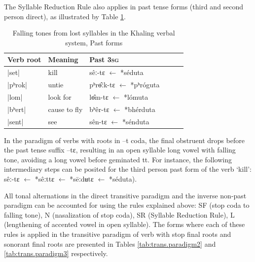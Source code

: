 \documentclass[oldfontcommands,oneside,a4paper,11pt]{article}
\newcommand{\ipa}[1]{{\phon \mbox{#1}}} %
\begin{document}
The Syllable Reduction Rule also applies in past tense forms (third and second person direct), as illustrated by Table \ref{tab:falling.verb3}. 

 
\begin{table}[h] 
\caption{Falling tones from lost syllables in the Khaling verbal system, Past forms} \centering  \label{tab:falling.verb3} 
\begin{tabular}{llllll} 
\toprule 
Verb root	&Meaning	& Past \textsc{3sg} \\ 
\midrule 
|\ipa{set}|	&	kill			&\ipa{sêː-tɛ} $\leftarrow$ \ipa{*séduta}  \\ 
|\ipa{pʰrok}|	&	untie		&\ipa{pʰrɵ̂ːk-tɛ} $\leftarrow$ \ipa{*pʰróguta} \\
|\ipa{lom}|	&	look for		&\ipa{lɵ̂m-tɛ} $\leftarrow$ \ipa{*lómuta}  \\ 
\midrule
|\ipa{bʰert}|	&	cause to fly			&\ipa{bʰêr-tɛ} $\leftarrow$ \ipa{*bhérduta} \\ 
|\ipa{sent}|	&	see			&\ipa{sên-tɛ} $\leftarrow$ \ipa{*sénduta}  \\ 
\bottomrule 
\end{tabular} 
\end{table} 

In the paradigm of verbs with roots in \ipa{--t} coda, the final obstruent drops before the past tense suffix \ipa{--tɛ}, resulting in an open syllable long vowel with falling tone, avoiding a long vowel before geminated \ipa{tt}. For instance, the following intermediary steps can be posited for the third person past form of the verb `kill': \ipa{sêː-tɛ}   $\leftarrow$ \ipa{*sêːttɛ}  $\leftarrow$ \ipa{*sēːdʉtɛ}  $\leftarrow$ \ipa{*séduta}).



All tonal alternations in the direct transitive paradigm and the inverse non-past paradigm can be accounted for using the rules explained above: SF (stop coda to falling tone), N (nasalization of stop coda), SR (Syllable Reduction Rule), L (lengthening of accented vowel in open syllable). The forms where each of these rules is applied in the transitive paradigm of verb with stop final roots and sonorant final roots are presented   in Tables \ref{tab:trans.paradigm2} and \ref{tab:trans.paradigm3} respectively.
\end{document}
